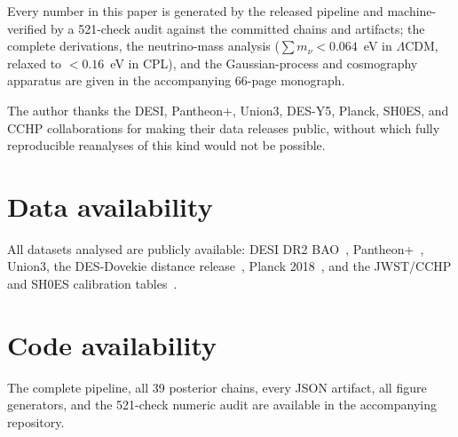 \documentclass[aps,prd,twocolumn,superscriptaddress,nofootinbib]{revtex4-2}
\begin{document}
Every number in this paper is generated by the released pipeline and machine-verified by a 521-check audit against the committed chains and artifacts; the complete derivations, the neutrino-mass analysis ($\sum m_\nu < 0.064$~eV in $\Lambda$CDM, relaxed to $< 0.16$~eV in CPL), and the Gaussian-process and cosmography apparatus are given in the accompanying 66-page monograph.

\begin{acknowledgments}
The author thanks the DESI, Pantheon+, Union3, DES-Y5, Planck, SH0ES, and CCHP collaborations for making their data releases public, without which fully reproducible reanalyses of this kind would not be possible.
\end{acknowledgments}

\section*{Data availability}
All datasets analysed are publicly available: DESI DR2 BAO~\cite{DESI2025}, Pantheon+~\cite{Brout2022,Scolnic2022}, Union3, the DES-Dovekie distance release~\cite{Popovic2025}, Planck 2018~\cite{Planck2020}, and the JWST/CCHP and SH0ES calibration tables~\cite{Riess2024,Freedman2025,Lee2025}.

\section*{Code availability}
The complete pipeline, all 39 posterior chains, every JSON artifact, all figure generators, and the 521-check numeric audit are available in the accompanying repository.
\end{document}
